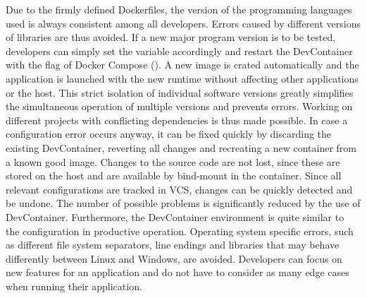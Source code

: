         Due to the firmly defined Dockerfiles, the version of the programming languages used is always consistent among all developers. Errors caused by different versions of libraries are thus avoided. If a new major program version is to be tested, developers can simply set the  variable accordingly and restart the DevContainer with the  flag of Docker Compose (). A new image is crated automatically and the application is launched with the new runtime without affecting other applications or the host. This strict isolation of individual software versions greatly simplifies the simultaneous operation of multiple versions and prevents errors. Working on different projects with conflicting dependencies is thus made possible.\newline
        In case a configuration error occurs anyway, it can be fixed quickly by discarding the existing DevContainer, reverting all changes and recreating a new container from a known good image. Changes to the source code are not lost, since these are stored on the host and are available by bind-mount in the container. Since all relevant configurations are tracked in \ac{VCS}, changes can be quickly detected and be undone.\newline
        The number of possible problems is significantly reduced by the use of DevContainer. Furthermore, the DevContainer environment is quite similar to the configuration in productive operation. Operating system specific errors, such as different file system separators, line endings and libraries that may behave differently between Linux and Windows, are avoided. Developers can focus on new features for an application and do not have to consider as many edge cases when running their application.

